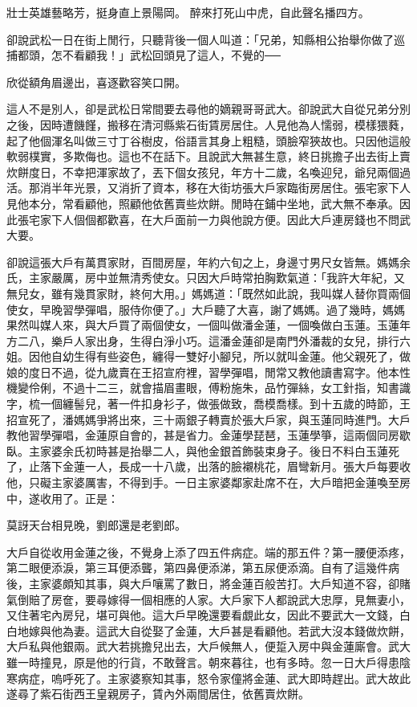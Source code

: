 壯士英雄藝略芳，挺身直上景陽岡。
醉來打死山中虎，自此聲名播四方。

卻說武松一日在街上閒行，只聽背後一個人叫道：「兄弟，知縣相公抬舉你做了巡捕都頭，怎不看顧我！」武松回頭見了這人，不覺的──

欣從額角眉邊出，喜逐歡容笑口開。

這人不是別人，卻是武松日常間要去尋他的嫡親哥哥武大。卻說武大自從兄弟分別之後，因時遭饑饉，搬移在清河縣紫石街賃房居住。人見他為人懦弱，模樣猥蕤，起了他個渾名叫做三寸丁谷樹皮，俗語言其身上粗糙，頭臉窄狹故也。只因他這般軟弱樸實，多欺侮也。這也不在話下。且說武大無甚生意，終日挑擔子出去街上賣炊餅度日，不幸把渾家故了，丟下個女孩兒，年方十二歲，名喚迎兒，爺兒兩個過活。那消半年光景，又消折了資本，移在大街坊張大戶家臨街房居住。張宅家下人見他本分，常看顧他，照顧他依舊賣些炊餅。閒時在鋪中坐地，武大無不奉承。因此張宅家下人個個都歡喜，在大戶面前一力與他說方便。因此大戶連房錢也不問武大要。

卻說這張大戶有萬貫家財，百間房屋，年約六旬之上，身邊寸男尺女皆無。媽媽余氏，主家嚴厲，房中並無清秀使女。只因大戶時常拍胸歎氣道：「我許大年紀，又無兒女，雖有幾貫家財，終何大用。」媽媽道：「既然如此說，我叫媒人替你買兩個使女，早晚習學彈唱，服侍你便了。」大戶聽了大喜，謝了媽媽。過了幾時，媽媽果然叫媒人來，與大戶買了兩個使女，一個叫做潘金蓮，一個喚做白玉蓮。玉蓮年方二八，樂戶人家出身，生得白淨小巧。這潘金蓮卻是南門外潘裁的女兒，排行六姐。因他自幼生得有些姿色，纏得一雙好小腳兒，所以就叫金蓮。他父親死了，做娘的度日不過，從九歲賣在王招宣府裡，習學彈唱，閒常又教他讀書寫字。他本性機變伶俐，不過十二三，就會描眉畫眼，傅粉施朱，品竹彈絲，女工針指，知書識字，梳一個纏髻兒，著一件扣身衫子，做張做致，喬模喬樣。到十五歲的時節，王招宣死了，潘媽媽爭將出來，三十兩銀子轉賣於張大戶家，與玉蓮同時進門。大戶教他習學彈唱，金蓮原自會的，甚是省力。金蓮學琵琶，玉蓮學箏，這兩個同房歇臥。主家婆余氏初時甚是抬舉二人，與他金銀首飾裝束身子。後日不料白玉蓮死了，止落下金蓮一人，長成一十八歲，出落的臉襯桃花，眉彎新月。張大戶每要收他，只礙主家婆厲害，不得到手。一日主家婆鄰家赴席不在，大戶暗把金蓮喚至房中，遂收用了。正是：

莫訝天台相見晚，劉郎還是老劉郎。

大戶自從收用金蓮之後，不覺身上添了四五件病症。端的那五件？第一腰便添疼，第二眼便添淚，第三耳便添聾，第四鼻便添涕，第五尿便添滴。自有了這幾件病後，主家婆頗知其事，與大戶嚷罵了數日，將金蓮百般苦打。大戶知道不容，卻賭氣倒賠了房奩，要尋嫁得一個相應的人家。大戶家下人都說武大忠厚，見無妻小，又住著宅內房兒，堪可與他。這大戶早晚還要看覷此女，因此不要武大一文錢，白白地嫁與他為妻。這武大自從娶了金蓮，大戶甚是看顧他。若武大沒本錢做炊餅，大戶私與他銀兩。武大若挑擔兒出去，大戶候無人，便踅入房中與金蓮廝會。武大雖一時撞見，原是他的行貨，不敢聲言。朝來暮往，也有多時。忽一日大戶得患陰寒病症，嗚呼死了。主家婆察知其事，怒令家僮將金蓮、武大即時趕出。武大故此遂尋了紫石街西王皇親房子，賃內外兩間居住，依舊賣炊餅。

